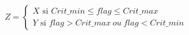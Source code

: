\[
Z = 
\begin{cases}
X \text{ si } Crit\_min \le flag \le Crit\_max \\
Y \text{ si } flag > Crit\_max ~{ ou }~  flag < Crit\_min
\end{cases}
\]

